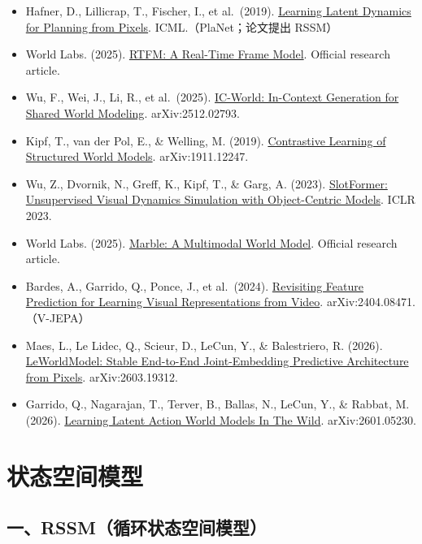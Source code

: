 \vspace{0.25em}
\begin{itemize}
\tightlist
\item
  Hafner, D., Lillicrap, T., Fischer, I., et al.~(2019). \href{https://arxiv.org/abs/1811.04551}{Learning Latent Dynamics for Planning from Pixels}. ICML.（PlaNet；论文提出 RSSM）
\item
  World Labs. (2025). \href{https://www.worldlabs.ai/blog/rtfm}{RTFM: A Real-Time Frame Model}. Official research article.
\item
  Wu, F., Wei, J., Li, R., et al.~(2025). \href{https://arxiv.org/abs/2512.02793}{IC-World: In-Context Generation for Shared World Modeling}. arXiv:2512.02793.
\item
  Kipf, T., van der Pol, E., \& Welling, M. (2019). \href{https://arxiv.org/abs/1911.12247}{Contrastive Learning of Structured World Models}. arXiv:1911.12247.
\item
  Wu, Z., Dvornik, N., Greff, K., Kipf, T., \& Garg, A. (2023). \href{https://arxiv.org/abs/2210.05861}{SlotFormer: Unsupervised Visual Dynamics Simulation with Object-Centric Models}. ICLR 2023.
\item
  World Labs. (2025). \href{https://www.worldlabs.ai/blog/marble-world-model}{Marble: A Multimodal World Model}. Official research article.
\item
  Bardes, A., Garrido, Q., Ponce, J., et al.~(2024). \href{https://arxiv.org/abs/2404.08471}{Revisiting Feature Prediction for Learning Visual Representations from Video}. arXiv:2404.08471.（V-JEPA）
\item
  Maes, L., Le Lidec, Q., Scieur, D., LeCun, Y., \& Balestriero, R. (2026). \href{https://arxiv.org/abs/2603.19312}{LeWorldModel: Stable End-to-End Joint-Embedding Predictive Architecture from Pixels}. arXiv:2603.19312.
\item
  Garrido, Q., Nagarajan, T., Terver, B., Ballas, N., LeCun, Y., \& Rabbat, M. (2026). \href{https://arxiv.org/abs/2601.05230}{Learning Latent Action World Models In The Wild}. arXiv:2601.05230.
\end{itemize}

\clearpage

\hypertarget{ux72b6ux6001ux7a7aux95f4ux6a21ux578b}{%
\section{状态空间模型}\label{ux72b6ux6001ux7a7aux95f4ux6a21ux578b}}

\hypertarget{ux4e00rssmux5faaux73afux72b6ux6001ux7a7aux95f4ux6a21ux578b}{%
\subsection{一、RSSM（循环状态空间模型）}\label{ux4e00rssmux5faaux73afux72b6ux6001ux7a7aux95f4ux6a21ux578b}}

